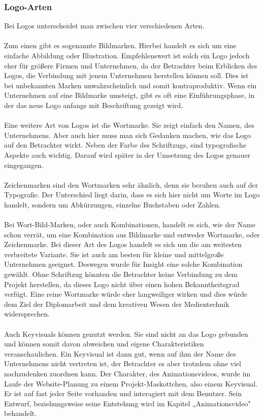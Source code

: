 \subsubsection{Logo-Arten}
Bei Logos unterscheidet man zwischen vier verschiedenen Arten.
\\
\\
Zum einen gibt es sogenannte Bildmarken. Hierbei handelt es sich um eine einfache Abbildung oder Illustration. Empfehlenswert ist solch ein Logo jedoch eher für größere Firmen und Unternehmen, da der Betrachter beim Erblicken des Logos, die Verbindung mit jenem Unternehmen herstellen können soll. Dies ist bei unbekannten Marken unwahrscheinlich und somit kontraproduktiv. Wenn ein Unternehmen auf eine Bildmarke umsteigt, gibt es oft eine Einführungsphase, in der das neue Logo anfangs mit Beschriftung gezeigt wird.\cite{marke}
\\
\\
Eine weitere Art von Logos ist die Wortmarke. Sie zeigt einfach den Namen, des Unternehmens. Aber auch hier muss man sich Gedanken machen, wie das Logo auf den Betrachter wirkt. Neben der Farbe des Schriftzugs, sind typografische Aspekte auch wichtig. Darauf wird später in der Umsetzung des Logos genauer eingegangen.\cite{marke}
\\
\\
Zeichenmarken sind den Wortmarken sehr ähnlich, denn sie beruhen auch auf der Typografie. Der Unterschied liegt darin, dass es sich hier nicht um Worte im Logo handelt, sondern um Abkürzungen, einzelne Buchstaben oder Zahlen.\cite{marke}\cite{zeichenmarke}
\\
\\
Bei Wort-Bild-Marken, oder auch Kombinationen, handelt es sich, wie der Name schon verrät, um eine Kombination aus Bildmarke und entweder Wortmarke, oder Zeichenmarke. Bei dieser Art des Logos handelt es sich um die am weitesten verbreitete Variante. Sie ist auch am besten für kleine und mittelgroße Unternehmen geeignet. Deswegen wurde für Insight eine solche Kombination gewählt. Ohne Schriftzug könnten die Betrachter keine Verbindung zu dem Projekt herstellen, da dieses Logo nicht über einen hohen Bekanntheitsgrad verfügt. Eine reine Wortmarke würde eher langweiliger wirken und dies würde dem Ziel der Diplomarbeit und dem kreativen Wesen der Medientechnik widersprechen.\cite{marke}
\\
\\
Auch Keyvisuals können genutzt werden. Sie sind nicht an das Logo gebunden und können somit davon abweichen und eigene Charakteristiken veranschaulichen. Ein Keyvisual ist dann gut, wenn auf ihm der Name des Unternehmens nicht vertreten ist, der Betrachter es aber trotzdem ohne viel nachzudenken zuordnen kann. Der Charakter, des Animationsvideos, wurde im Laufe der Website-Planung zu einem Projekt-Maskottchen, also einem Keyvisual. Er ist auf fast jeder Seite vorhanden und interagiert mit dem Benutzer. Sein Entwurf, beziehungsweise seine Entstehung wird im Kapitel „Animationsvideo" behandelt.\cite{marke}


